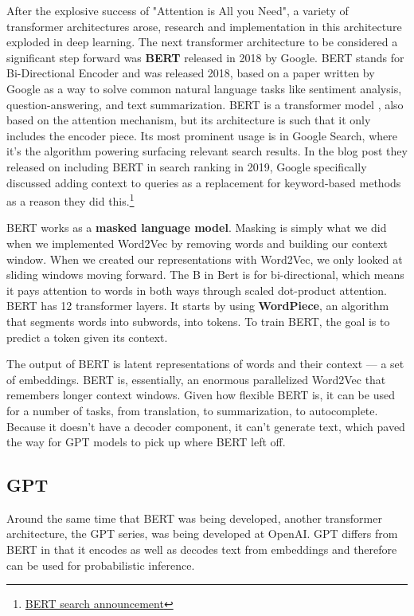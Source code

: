 \documentclass[11pt, table]{diazessay} %
\begin{document}
\begin{sloppypar}
After the explosive success of "Attention is All you Need", a variety of transformer architectures arose, research and implementation in this architecture exploded in deep learning. The next transformer architecture to be considered a significant step forward was \textbf{BERT} released in 2018 by Google. 
BERT stands for Bi-Directional Encoder and was released 2018\citep{devlin2018bert}, based on a paper written by Google as a way to solve common natural language tasks like sentiment analysis, question-answering, and text summarization. BERT is a transformer model , also based on the attention mechanism, but its architecture is such that it only includes the encoder piece. Its most prominent usage is in Google Search, where it's the algorithm powering surfacing relevant search results. In the blog post they released on including BERT in search ranking in 2019, Google specifically discussed adding context to queries as a replacement for keyword-based methods as a reason they did this.\footnote{\href{https://blog.google/products/search/search-language-understanding-bert/}{BERT search announcement}}

BERT works as a \textbf{masked language model}. Masking is simply what we did when we implemented Word2Vec by removing words and building our context window. When we created our representations with Word2Vec, we only looked at sliding windows moving forward. The B in Bert is for bi-directional, which means it pays attention to words in both ways through scaled dot-product attention. BERT has 12 transformer layers. It starts by using \textbf{WordPiece}, an algorithm that segments words into subwords, into tokens. To train BERT, the goal is to predict a token given its context.

 The output of BERT is latent representations of words and their context --- a set of embeddings. BERT is, essentially, an enormous parallelized Word2Vec that remembers longer context windows.  Given how flexible BERT is, it can be used for a number of tasks, from translation, to summarization, to autocomplete. Because it doesn't have a decoder component, it can't generate text, which paved the way for GPT models to pick up where BERT left off.


\subsection{GPT}
Around the same time that BERT was being developed, another transformer architecture, the GPT series, was being developed at OpenAI. GPT differs from BERT in that it encodes as well as decodes text from embeddings and therefore can be used for probabilistic inference.


\end{sloppypar}
\end{document}
